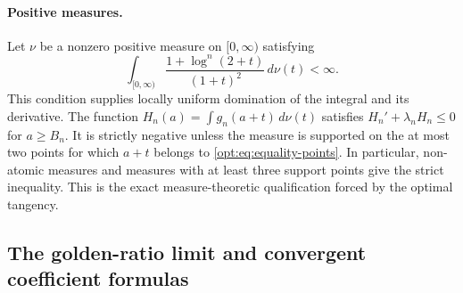 \paragraph{Positive measures.}
Let $\nu$ be a nonzero positive measure on $[0,\infty)$ satisfying
\[
 \int_{[0,\infty)}\frac{1+\log^n(2+t)}{(1+t)^2}\,d\nu(t)<\infty.
\]
This condition supplies locally uniform domination of the integral
and its derivative. The function
$H_n(a)=\int g_n(a+t)\,d\nu(t)$ satisfies
$H_n'+\lambda_nH_n\leq0$ for $a\geq B_n$. It is strictly negative
unless the measure is supported on the at most two points for which
$a+t$ belongs to \eqref{opt:eq:equality-points}. In particular,
non-atomic measures and measures with at least three support points
give the strict inequality. This is the exact measure-theoretic
qualification forced by the optimal tangency.

\subsection{The golden-ratio limit and convergent coefficient formulas}
\label{opt:sec:asymptotic}

